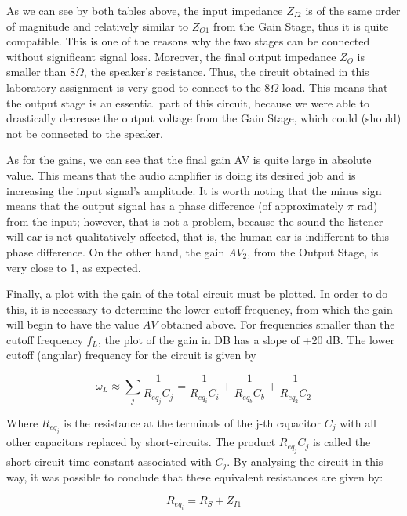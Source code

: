 As we can see by both tables above, the input impedance $Z_{I2}$ is of the same order of magnitude and relatively similar to $Z_{O1}$ from the Gain Stage, thus it is quite compatible. This is one of the reasons why the two stages can be connected without significant signal loss. Moreover, the final output impedance $Z_O$ is smaller than 8$\Omega$, the speaker's resistance. Thus, the circuit obtained in this laboratory assignment is very good to connect to the 8$\Omega$ load. This means that the output stage is an essential part of this circuit, because we were able to drastically decrease the output voltage from the Gain Stage, which could (should) not be connected to the speaker.
\par
As for the gains, we can see that the final gain AV is quite large in absolute value. This means that the audio amplifier is doing its desired job and is increasing the input signal's amplitude. It is worth noting that the minus sign means that the output signal has a phase difference (of approximately $\pi$ rad) from the input; however, that is not a problem, because the sound the listener will ear is not qualitatively affected, that is, the human ear is indifferent to this phase difference. On the other hand, the gain $AV_2$, from the Output Stage, is very close to 1, as expected.
\par
Finally, a plot with the gain of the total circuit must be plotted. In order to do this, it is necessary to determine the lower cutoff frequency, from which the gain will begin to have the value $AV$ obtained above. For frequencies smaller than the cutoff frequency $f_L$, the plot of the gain in DB has a slope of +20 dB. The lower cutoff (angular) frequency for the circuit is given by

\begin{equation} \label{eq:cutoff_frequency_law}
  \omega_L\approx\sum_{j} \frac{1}{R_{eq_j}C_j}=\frac{1}{R_{eq_i}C_i}+\frac{1}{R_{eq_b}C_b}+\frac{1}{R_{eq_2}C_2}
\end{equation}

Where $R_{eq_j}$ is the resistance at the terminals of the j-th capacitor $C_j$ with all other capacitors replaced by short-circuits. The product $R_{eq_j}C_j$ is called the short-circuit time constant associated with $C_j$. By analysing the circuit in this way, it was possible to conclude that these equivalent resistances are given by:

\begin{equation} \label{eq:equivalent_resistance_i}
  R_{eq_i}=R_S+Z_{I1}
\end{equation}

